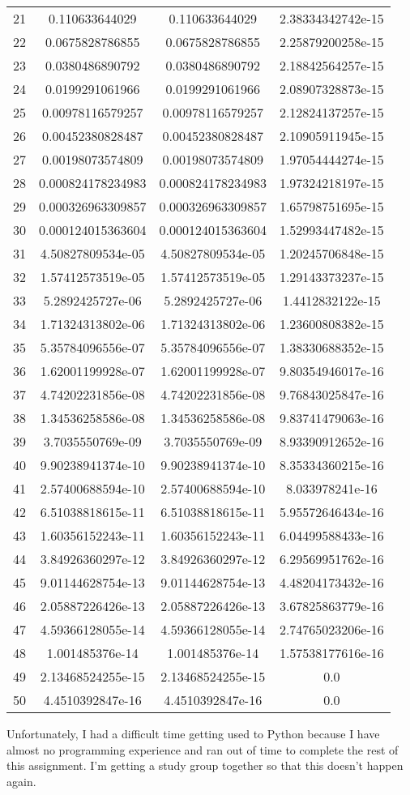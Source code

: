\documentclass[10pt]{article}
\begin{document}
\begin{table}[H]
\begin{tabular}{c c c c}
21 & 0.110633644029 & 0.110633644029 & 2.38334342742e-15 \\
22 & 0.0675828786855 & 0.0675828786855 & 2.25879200258e-15 \\
23 & 0.0380486890792 & 0.0380486890792 & 2.18842564257e-15 \\
24 & 0.0199291061966 & 0.0199291061966 & 2.08907328873e-15 \\
25 & 0.00978116579257 & 0.00978116579257 & 2.12824137257e-15 \\
26 & 0.00452380828487 & 0.00452380828487 & 2.10905911945e-15 \\
27 & 0.00198073574809 & 0.00198073574809 & 1.97054444274e-15 \\
28 & 0.000824178234983 & 0.000824178234983 & 1.97324218197e-15 \\
29 & 0.000326963309857 & 0.000326963309857 & 1.65798751695e-15 \\
30 & 0.000124015363604 & 0.000124015363604 & 1.52993447482e-15 \\
31 & 4.50827809534e-05 & 4.50827809534e-05 & 1.20245706848e-15 \\
32 & 1.57412573519e-05 & 1.57412573519e-05 & 1.29143373237e-15 \\
33 & 5.2892425727e-06 & 5.2892425727e-06 & 1.4412832122e-15 \\
34 & 1.71324313802e-06 & 1.71324313802e-06 & 1.23600808382e-15 \\
35 & 5.35784096556e-07 & 5.35784096556e-07 & 1.38330688352e-15 \\
36 & 1.62001199928e-07 & 1.62001199928e-07 & 9.80354946017e-16 \\
37 & 4.74202231856e-08 & 4.74202231856e-08 & 9.76843025847e-16 \\
38 & 1.34536258586e-08 & 1.34536258586e-08 & 9.83741479063e-16 \\
39 & 3.7035550769e-09 & 3.7035550769e-09 & 8.93390912652e-16 \\
40 & 9.90238941374e-10 & 9.90238941374e-10 & 8.35334360215e-16 \\
41 & 2.57400688594e-10 & 2.57400688594e-10 & 8.033978241e-16 \\
42 & 6.51038818615e-11 & 6.51038818615e-11 & 5.95572646434e-16 \\
43 & 1.60356152243e-11 & 1.60356152243e-11 & 6.04499588433e-16 \\
44 & 3.84926360297e-12 & 3.84926360297e-12 & 6.29569951762e-16 \\
45 & 9.01144628754e-13 & 9.01144628754e-13 & 4.48204173432e-16 \\
46 & 2.05887226426e-13 & 2.05887226426e-13 & 3.67825863779e-16 \\
47 & 4.59366128055e-14 & 4.59366128055e-14 & 2.74765023206e-16 \\
48 & 1.001485376e-14 & 1.001485376e-14 & 1.57538177616e-16 \\
49 & 2.13468524255e-15 & 2.13468524255e-15 & 0.0 \\
50 & 4.4510392847e-16 & 4.4510392847e-16 & 0.0 \\
\hline %
\end{tabular} 
\end{table} 

Unfortunately, I had a difficult time getting used to Python because I have almost no programming experience and ran out of time to complete the rest of this assignment. I'm getting a study group together so that this doesn't happen again.
\end{document}
